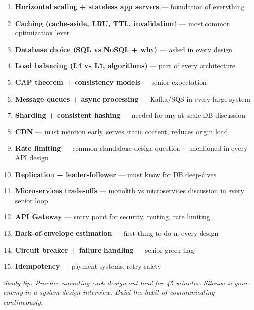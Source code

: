 \documentclass[11pt]{article}
\providecommand{\tightlist}{\setlength{\itemsep}{1pt}\setlength{\parskip}{0pt}}
\begin{document}
\begin{enumerate}
\def\labelenumi{\arabic{enumi}.}
\tightlist
\item
  \textbf{Horizontal scaling + stateless app servers} --- foundation of everything
\item
  \textbf{Caching (cache-aside, LRU, TTL, invalidation)} --- most common optimization lever
\item
  \textbf{Database choice (SQL vs NoSQL + why)} --- asked in every design
\item
  \textbf{Load balancing (L4 vs L7, algorithms)} --- part of every architecture
\item
  \textbf{CAP theorem + consistency models} --- senior expectation
\item
  \textbf{Message queues + async processing} --- Kafka/SQS in every large system
\item
  \textbf{Sharding + consistent hashing} --- needed for any at-scale DB discussion
\item
  \textbf{CDN} --- must mention early, serves static content, reduces origin load
\item
  \textbf{Rate limiting} --- common standalone design question + mentioned in every API design
\item
  \textbf{Replication + leader-follower} --- must know for DB deep-dives
\item
  \textbf{Microservices trade-offs} --- monolith vs microservices discussion in every senior loop
\item
  \textbf{API Gateway} --- entry point for security, routing, rate limiting
\item
  \textbf{Back-of-envelope estimation} --- first thing to do in every design
\item
  \textbf{Circuit breaker + failure handling} --- senior green flag
\item
  \textbf{Idempotency} --- payment systems, retry safety
\end{enumerate}

\emph{Study tip: Practice narrating each design out loud for 45 minutes. Silence is your enemy in a system design interview. Build the habit of communicating continuously.}
\end{document}
